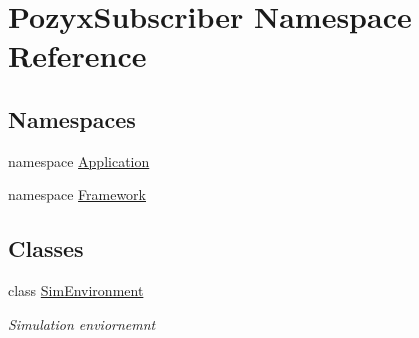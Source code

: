 \hypertarget{namespace_pozyx_subscriber}{}\section{Pozyx\+Subscriber Namespace Reference}
\label{namespace_pozyx_subscriber}
\subsection*{Namespaces}
\begin{DoxyCompactItemize}
\item 
namespace \hyperlink{namespace_pozyx_subscriber_1_1_application}{Application}
\item 
namespace \hyperlink{namespace_pozyx_subscriber_1_1_framework}{Framework}
\end{DoxyCompactItemize}
\subsection*{Classes}
\begin{DoxyCompactItemize}
\item 
class \hyperlink{class_pozyx_subscriber_1_1_sim_environment}{Sim\+Environment}
\begin{DoxyCompactList}\small\item\em Simulation enviornemnt \end{DoxyCompactList}\end{DoxyCompactItemize}
